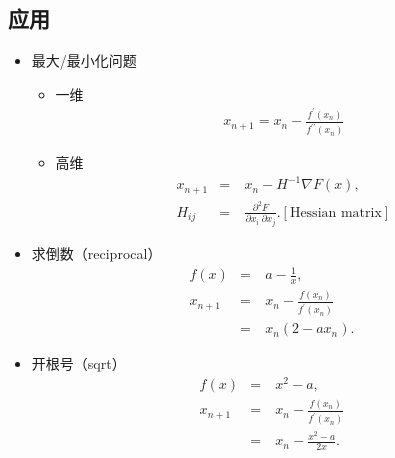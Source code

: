 \documentclass[letterpaper,10pt,english]{sphinxmanual}
\begin{document}
\subsection{应用}
\label{\detokenize{machineLearning/05_newton:id5}}\begin{itemize}
\item {} 
最大/最小化问题
\begin{itemize}
\item {} 
一维
\begin{equation*}
\begin{split}x_{n+1} = x_n - \frac{f^{\prime}(x_n)}{f^{\prime\prime}(x_n)}\end{split}
\end{equation*}
\item {} 
高维
\begin{equation*}
\begin{split}x_{n+1} & = &\ x_n - H^{-1} \nabla F(x),\\
H_{ij} & = &\ \frac{\partial^2 F}{\partial x_i \ \partial x_j}. [\text{Hessian matrix}]\end{split}
\end{equation*}
\end{itemize}

\item {} 
求倒数（reciprocal）
\begin{equation*}
\begin{split}f(x) & = &\  a - \frac{1}{x},\\
x_{n+1} & = &\ x_n - \frac{f(x_n)}{f^{\prime}(x_n)} \\
 & = &\ x_n (2 - a x_n).\end{split}
\end{equation*}
\item {} 
开根号（sqrt）
\begin{equation*}
\begin{split}f(x) & = &\  x^2 - a,\\
x_{n+1} & = &\ x_n - \frac{f(x_n)}{f^{\prime}(x_n)} \\
& = &\ x_n - \frac{x^2 - a}{2x}.\end{split}
\end{equation*}
%
\begin{sphinxVerbatim}[commandchars=\\\{\},numbers=left,firstnumber=1,stepnumber=1]
 
    
       
                
   
\end{sphinxVerbatim}

\end{itemize}
\end{document}
